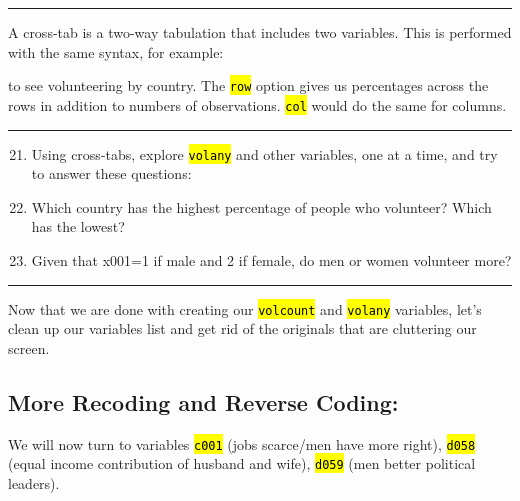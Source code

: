 \documentclass{tufte-handout}
\begin{document}
\bigskip
\hrule
\bigskip
	
\medskip
{}
\medskip

A cross-tab is a two-way tabulation that includes two variables. This is performed with the same syntax, for example:

\bigskip
{}
\bigskip

\noindent to see volunteering by country. The {\tt \hl{row}} option gives us percentages across the rows in addition to numbers of observations. {\tt \hl{col}} would do the same for columns.

\bigskip
\hrule
\bigskip

\begin{enumerate}[leftmargin=.5in]
\setcounter{enumi}{20}
	\item Using cross-tabs, explore {\tt \hl{volany}} and other variables, one at a time, and try to answer these questions:
	\item Which country has the highest percentage of people who volunteer? Which has the lowest?
	\item Given that x001=1 if male and 2 if female, do men or women volunteer more?
 \end{enumerate}

\bigskip
\hrule
\bigskip
	
\medskip
{}
\medskip

Now that we are done with creating our {\tt \hl{volcount}} and {\tt \hl{volany}} variables, let's clean up our variables list and get rid of the originals that are cluttering our screen.

\bigskip
{} 

\subsection{More Recoding and Reverse Coding:}

\medskip
{}
\medskip

We will now turn to variables {\tt \hl{c001}} (jobs scarce/men have more right), {\tt \hl{d058}} (equal income contribution of husband and wife), {\tt \hl{d059}} (men better political leaders).
\end{document}
